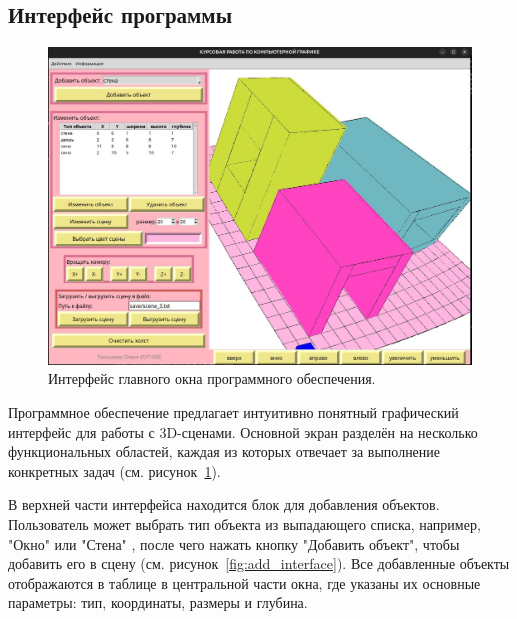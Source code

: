 \subsection{Интерфейс программы}

\begin{figure}[H]
    \centering
    \includegraphics[width=1\textwidth]{img/main_interface.png}
    \caption{Интерфейс главного окна программного обеспечения.}
    \label{fig:main_interface}
\end{figure}

Программное обеспечение предлагает интуитивно понятный графический интерфейс для работы с 3D-сценами. Основной экран разделён на несколько функциональных областей, каждая из которых отвечает за выполнение конкретных задач (см. рисунок~\ref{fig:main_interface}).

В верхней части интерфейса находится блок для добавления объектов. Пользователь может выбрать тип объекта из выпадающего списка, например, "Окно" или "Стена" , после чего нажать кнопку "Добавить объект", чтобы добавить его в сцену (см. рисунок~\ref{fig:add_interface}). Все добавленные объекты отображаются в таблице в центральной части окна, где указаны их основные параметры: тип, координаты, размеры и глубина.


